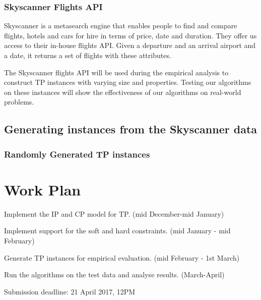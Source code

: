 \documentclass{mprop}
\theoremstyle{definition}
\begin{document}
\subsubsection{Skyscanner Flights API}
Skyscanner is a metasearch engine that enables people to find and compare flights, hotels and cars for hire in terms of price, date and duration.
They offer us access to their in-house flights API. Given a departure and an arrival airport and a date, it returns a set of flights with these attributes.

The Skyscanner flights API will be used during the empirical analysis to construct TP instances with varying size and properties. Testing our algorithms on these instances will show the effectiveness of our algorithms on real-world problems.

\subsection*{Generating instances from the Skyscanner data}

\subsubsection{Randomly Generated TP instances}

\section{Work Plan}

Implement the IP and CP model for TP. (mid December-mid January)

Implement support for the soft and hard constraints. (mid January - mid February)

Generate TP instances for empirical evaluation. (mid February - 1st March)

Run the algorithms on the test data and analyse results. (March-April)

Submission deadline: 21 April 2017, 12PM 



\end{document}
